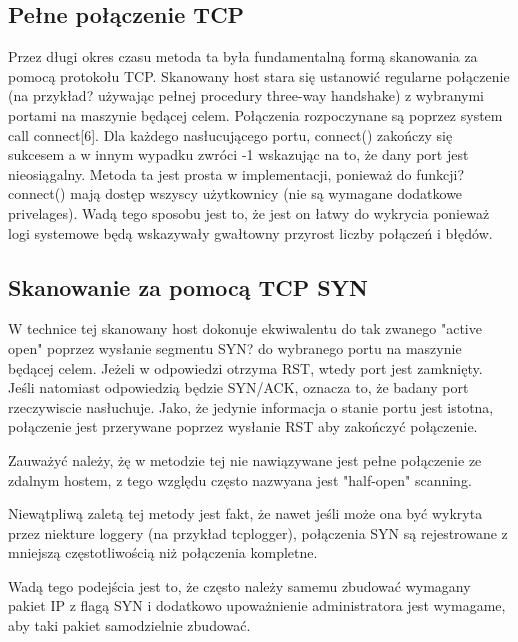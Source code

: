 \subsection{Pełne połączenie TCP}

Przez długi okres czasu metoda ta była fundamentalną formą skanowania za pomocą protokołu TCP. Skanowany host stara się ustanowić regularne połączenie (na przykład? używając pełnej procedury three-way handshake) z wybranymi portami na maszynie będącej celem. Połączenia rozpoczynane są poprzez system call connect[6]. Dla każdego nasłucującego portu, connect() zakończy się sukcesem a w innym wypadku zwróci -1 wskazując na to, że dany port jest nieosiągalny. Metoda ta jest prosta w implementacji, ponieważ do funkcji? connect() mają dostęp wszyscy użytkownicy (nie są wymagane dodatkowe privelages).
Wadą tego sposobu jest to, że jest on łatwy do wykrycia ponieważ logi systemowe będą wskazywały gwałtowny przyrost liczby połączeń i błędów. 



\subsection{Skanowanie za pomocą TCP SYN}

W technice tej skanowany host dokonuje ekwiwalentu do tak zwanego "active open" poprzez wysłanie segmentu SYN? do wybranego portu na maszynie będącej celem. Jeżeli w odpowiedzi otrzyma RST, %
wtedy port jest zamknięty. Jeśli natomiast odpowiedzią będzie SYN/ACK, oznacza to, że badany port rzeczywiscie nasłuchuje. Jako, że jedynie informacja o stanie portu jest istotna, połączenie jest przerywane poprzez wysłanie RST aby zakończyć połączenie.

Zauważyć należy, żę w metodzie tej nie nawiązywane jest pełne połączenie ze zdalnym hostem, z tego względu często nazwyana jest "half-open" scanning.

Niewątpliwą zaletą tej metody jest fakt, że nawet jeśli może ona być wykryta przez niekture loggery (na przykład tcplogger), połączenia SYN są rejestrowane z mniejszą częstotliwością niż połączenia kompletne.

Wadą tego podejścia jest to, że często należy samemu zbudować wymagany pakiet IP z flagą SYN i dodatkowo upoważnienie administratora jest wymagame, aby taki pakiet samodzielnie zbudować. 

